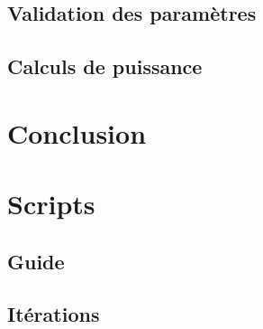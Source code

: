 \documentclass[a4paper,11pt]{report}
\begin{document}
\section{Validation des paramètres}
\section{Calculs de puissance}
\chapter*{Conclusion}

\appendix
\chapter{Scripts}
\section{Guide}
\section{Itérations}



\end{document}
